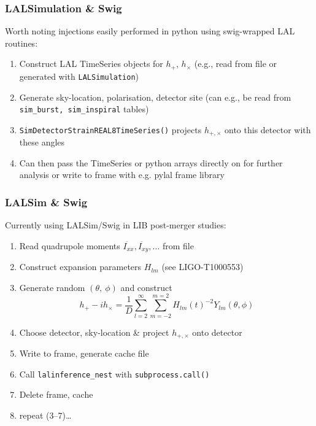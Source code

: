 \documentclass{beamer}
\begin{document}
\begin{frame}
    \frametitle{LALSimulation \& Swig}
    Worth noting injections easily performed in python using swig-wrapped LAL
    routines:
    \begin{enumerate}
        \item Construct LAL TimeSeries objects for $h_+$, $h_{\times}$ (e.g.,
            read from file or generated with {\tt LALSimulation})
        \item Generate sky-location, polarisation, detector site (can e.g., be
            read from {\tt sim\_burst, sim\_inspiral} tables)
        \item {\tt SimDetectorStrainREAL8TimeSeries()} projects $h_{+,\times}$
            onto this detector with these angles
        \item Can then pass the TimeSeries or python arrays directly on for
            further analysis or write to frame with e.g. pylal frame library
    \end{enumerate}
\end{frame}

\begin{frame}
    \frametitle{LALSim \& Swig}
    Currently using LALSim/Swig in LIB post-merger studies:
    \begin{enumerate}
        \item Read quadrupole moments $\ddot{I_{xx}}, \ddot{I_{xy}}, \dots$ from
            file
        \item Construct expansion parameters $H_{lm}$ (see LIGO-T1000553)
        \item Generate random $(\theta,~\phi)$ and construct
            \begin{equation}
                h_+ - ih_{\times} = \frac{1}{D} \sum_{l=2}^{\infty}
                \sum_{m=-2}^{m=2} H_{lm}(t) ^{-2}Y_{lm}(\theta, \phi)
            \end{equation}
        \item Choose detector, sky-location \& project $h_{+,\times}$ onto
            detector
        \item Write to frame, generate cache file
        \item Call {\tt lalinference\_nest} with {\tt subprocess.call()}
        \item Delete frame, cache
        \item repeat (3--7)\dots
    \end{enumerate}
\end{frame}
\end{document}
